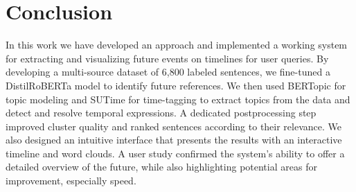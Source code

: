 \documentclass[a4paper,10pt]{report} %
\begin{document}
\chapter{Conclusion}
In this work we have developed an approach and implemented a working system for extracting and visualizing future events on timelines for user queries. By developing a multi-source dataset of 6,800 labeled sentences, we fine-tuned a DistilRoBERTa model to identify future references. We then used BERTopic for topic modeling and SUTime for time-tagging to extract topics from the data and detect and resolve temporal expressions. A dedicated postprocessing step improved cluster quality and ranked sentences according to their relevance. We also designed an intuitive interface that presents the results with an interactive timeline and word clouds. A user study confirmed the system's ability to offer a detailed overview of the future, while also highlighting potential areas for improvement, especially speed.




\end{document}
